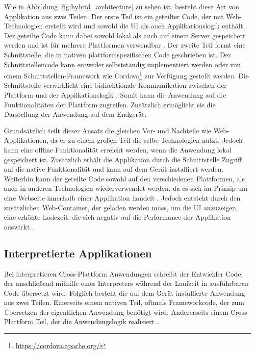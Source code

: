 Wie in Abbildung \ref{fig:hybrid_architecture} zu sehen ist, besteht diese Art von Applikation aus zwei Teilen.
Der erste Teil ist ein geteilter Code, der mit Web-Technologien erstellt wird und sowohl die UI als auch Applikationslogik enthält. Der geteilte Code kann dabei sowohl lokal als auch auf einem Server gespeichert werden und ist für mehrere Plattformen verwendbar \cite{2017hybrid_approach_end}.
Der zweite Teil formt eine Schnittstelle, die in nativen plattformspezifischen Code geschrieben ist. Der Schnittstellencode kann entweder selbstständig implementiert werden oder von einem Schnittstellen-Framework wie Cordova\footnote{\url{https://cordova.apache.org/}} zur Verfügung gestellt werden. Die Schnittstelle verwirklicht eine bidirektionale Kommunikation zwischen der Plattform und der Applikationslogik \cite{ELKASSAS2017163}. Somit kann die Anwendung auf die Funktionalitäten der Plattform zugreifen. Zusätzlich ermöglicht sie die Darstellung der Anwendung auf dem Endgerät. 

Grundsätzlich teilt dieser Ansatz die gleichen Vor- und Nachteile wie Web-Applikationen, da er zu einem großen Teil die selbe Technologien nutzt. Jedoch kann eine offline Funktionalität erreicht werden, wenn die Anwendung lokal gespeichert ist. Zusätzlich erhält die Applikation durch die Schnittstelle Zugriff auf die native Funktionalität und kann auf dem Gerät installiert werden. Weiterhin kann der geteilte Code sowohl auf den verschiedenen Plattformen, als auch in anderen Technologien wiederverwendet werden, da es sich im Prinzip um eine Webseite innerhalb einer Applikation handelt \cite{IEEE_development_classes}. Jedoch entsteht durch den zusätzlichen Web-Container, der geladen werden muss, um die UI anzuzeigen, eine erhöhte Ladezeit, die sich negativ auf die Performance der Applikation auswirkt \cite{IEEE_development_classes}.

\subsection{Interpretierte Applikationen}
\label{cha:3_2_interpretiert}
Bei interpretieren Cross-Plattform Anwendungen schreibt der Entwickler Code, der anschließend mithilfe eines Interpreters während der Laufzeit in ausführbaren Code übersetzt wird. Folglich besteht die auf dem Gerät installierte Anwendung aus zwei Teilen. Einerseits einem nativen Teil, oftmals Frameworkcode, der zum Übersetzen der eigentlichen Anwendung benötigt wird. Andererseits einem Cross-Plattform Teil, der die Anwendungslogik realisiert \cite{IEEE_development_classes}.

